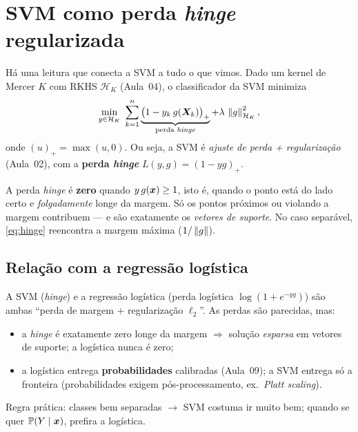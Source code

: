 \documentclass[11pt,a4paper]{article}
\begin{document}
\section{SVM como perda \emph{hinge} regularizada}
Há uma leitura que conecta a SVM a tudo o que vimos. Dado um kernel de Mercer $K$
com RKHS $\mathcal{H}_K$ (Aula~04), o classificador da SVM minimiza
\begin{equation}\label{eq:hinge}
  \min_{g\in\mathcal{H}_K}\ \sum_{k=1}^n \underbrace{\big(1-y_k\,g(\bm{X}_k)\big)_+}_{\text{perda \emph{hinge}}}
  + \lambda\,\left\lVert g \right\rVert_{\mathcal{H}_K}^2 ,
\end{equation}
onde $(u)_+=\max(u,0)$. Ou seja, a SVM é \emph{ajuste de perda + regularização}
(Aula~02), com a \textbf{perda \emph{hinge}} $L(y,g)=(1-yg)_+$.

\begin{observacao}
A perda \emph{hinge} é \textbf{zero} quando $y\,g(\bm{x})\ge 1$, isto é, quando o ponto
está do lado certo e \emph{folgadamente} longe da margem. Só os pontos próximos ou
violando a margem contribuem --- e são exatamente os \emph{vetores de suporte}. No
caso separável, \eqref{eq:hinge} reencontra a margem máxima ($1/\left\lVert g \right\rVert$).
\end{observacao}

\subsection{Relação com a regressão logística}
A SVM (\emph{hinge}) e a regressão logística (perda logística
$\log(1+e^{-yg})$) são ambas ``perda de margem $+$ regularização $\ell_2$''. As
perdas são parecidas, mas:
\begin{itemize}[leftmargin=1.4cm,nosep]
  \item a \emph{hinge} é exatamente zero longe da margem $\Rightarrow$ solução
        \emph{esparsa} em vetores de suporte; a logística nunca é zero;
  \item a logística entrega \textbf{probabilidades} calibradas (Aula~09); a SVM
        entrega só a fronteira (probabilidades exigem pós-processamento, ex.\
        \emph{Platt scaling}).
\end{itemize}
Regra prática: classes bem separadas $\to$ SVM costuma ir muito bem; quando se quer
$\mathbb{P}(Y\mid\bm{x})$, prefira a logística.

\end{document}
